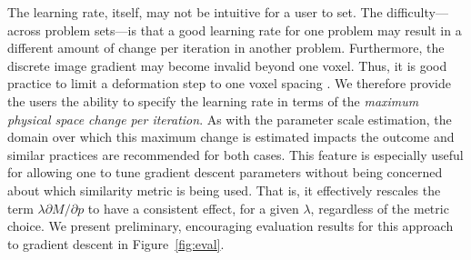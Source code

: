 \documentclass{llncs}
\begin{document}
The learning rate, itself, may not be intuitive for a user to set.
The difficulty---across problem sets---is that a good learning rate for
one problem may result in a different amount of change per iteration
in another problem.  Furthermore, the discrete image gradient may
become invalid beyond one voxel.  Thus, it is good practice to limit a deformation step to one voxel spacing
\cite{Jenkinson2001}.  We therefore provide the users the ability to
specify the learning rate in terms of the {\em maximum physical space change
  per iteration}.  As with the parameter scale estimation, the domain
over which this maximum change is estimated impacts the outcome and
similar practices are recommended for both cases.   This feature is
especially useful for allowing one to tune gradient descent parameters
without being concerned about which similarity metric is being used.
That is, it effectively rescales the term $\lambda \partial M / \partial p$ to
have a consistent effect, for a given $\lambda$, regardless of the metric choice.
We present preliminary, encouraging evaluation results for this approach to
gradient descent in Figure~\ref{fig:eval}.
\end{document}
